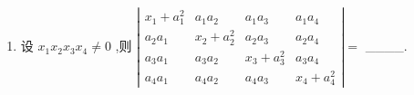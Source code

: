\documentclass[12pt, a4paper, oneside, UTF8]{ctexbook}
\begin{document}
\begin{enumerate}[label=\arabic*.]
    \begin{align*}
    \left|\begin{array}{lll}
    a & a^2 & bc \\
    b & b^2 & a c \\
    c & c^2 & a b 
    \end{array}\right|=\_\_\_\_
    \end{align*}
    
    \begin{solution}
    \color{blue}
    \begin{align*}
    \text{原式} &\xlongequal{\text{第一列乘以(a+b+c)加到第三列}}\left|\begin{array}{lll}
    a & a^2 & a^2 + ac + ab + bc \\
    b & b^2 & a^2 + ac + ab + bc \\
    c & c^2 & a^2 + ac + ab + bc 
    \end{array}\right| \\
    &\xlongequal{\text{第二列乘-1加到最后一列,提取公因式,并交换}} (ab+ac+bc)\left|\begin{array}{lll}
    1 & a & a^2 \\
    1 & b & b^2 \\
    1 & c & c^2 
    \end{array}\right| \\
    &= (ac+bc+ab)(b-a)(c-a)(c-b)
    \end{align*}
    \end{solution}
    
    \newpage

    \item 设 \( {x}_{1}{x}_{2}{x}_{3}{x}_{4} \neq  0 \) ,则 
    \( \left| \begin{matrix} 
        {x}_{1}+{a}_{1}^{2}&{a}_{1}{a}_{2}&{a}_{1}{a}_{3} & {a}_{1}{a}_{4} \\  
        {a}_{2}{a}_{1} & {x}_{2} + {a}_{2}^{2} & {a}_{2}{a}_{3} & {a}_{2}{a}_{4} \\  
        {a}_{3}{a}_{1} & {a}_{3}{a}_{2} & {x}_{3} + {a}_{3}^{2} & {a}_{3}{a}_{4} \\  
        {a}_{4}{a}_{1} & {a}_{4}{a}_{2} & {a}_{4}{a}_{3} & {x}_{4} + {a}_{4}^{2} 
    \end{matrix}\right|  = \) \_\_\_\_.
    

\end{enumerate}
\end{document}
